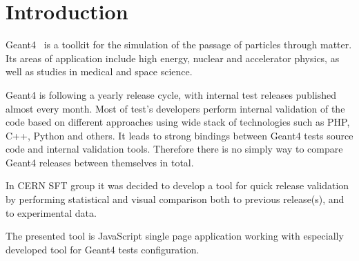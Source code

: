 \section{Introduction}
\label{sec-introduction}
Geant4~\cite{Geant4} is a toolkit for the simulation of the passage of particles through matter. Its areas of application include high energy, nuclear and accelerator physics, as well as studies in medical and space science. 

Geant4 is following a yearly release cycle, with internal test releases published almost every month.
Most of test's developers perform internal validation of the code based on different approaches using wide stack of technologies such as PHP, C++, Python and others.
It leads to strong bindings between Geant4 tests source code and internal validation tools.
Therefore there is no simply way to compare Geant4 releases between themselves in total.

In CERN SFT group it was decided to develop a tool for quick release validation by performing statistical and visual comparison both to previous release(s), and to experimental data. 

The presented tool is JavaScript single page application working with especially developed tool for Geant4 tests configuration.